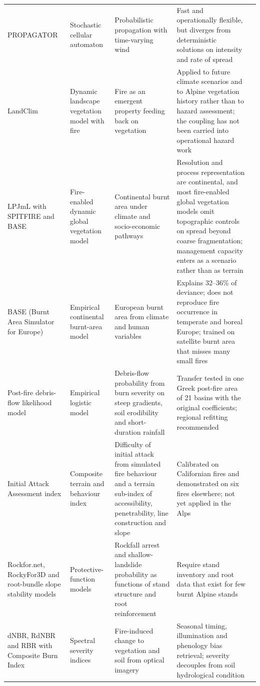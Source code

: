 \documentclass[11pt,a4paper]{article}
\begin{document}
{\begin{xltabular}{\textwidth}{@{}>{\raggedright\arraybackslash}p{2.35cm} >{\raggedright\arraybackslash}p{2.1cm} >{\raggedright\arraybackslash}X >{\raggedright\arraybackslash}X >{\raggedright\arraybackslash}p{2.5cm}@{}}
PROPAGATOR & Stochastic cellular automaton & Probabilistic propagation with time-varying wind & Fast and operationally flexible, but diverges from deterministic solutions on intensity and rate of spread & \citealp{malanchini_modeling_2025} \\
LandClim & Dynamic landscape vegetation model with fire & Fire as an emergent property feeding back on vegetation & Applied to future climate scenarios and to Alpine vegetation history rather than to hazard assessment; the coupling has not been carried into operational hazard work & \citealp{schumacher_relative_2006, colombaroli_species_2010} \\
LPJmL with SPITFIRE and BASE & Fire-enabled dynamic global vegetation model & Continental burnt area under climate and socio-economic pathways & Resolution and process representation are continental, and most fire-enabled global vegetation models omit topographic controls on spread beyond coarse fragmentation; management capacity enters as a scenario rather than as terrain & \citealp{jones_global_2022, billing_future_2026} \\
BASE (Burnt Area Simulator for Europe) & Empirical continental burnt-area model & European burnt area from climate and human variables & Explains 32--36\% of deviance; does not reproduce fire occurrence in temperate and boreal Europe; trained on satellite burnt area that misses many small fires & \citealp{forrest_understanding_2024} \\
Post-fire debris-flow likelihood model & Empirical logistic model & Debris-flow probability from burn severity on steep gradients, soil erodibility and short-duration rainfall & Transfer tested in one Greek post-fire area of 21 basins with the original coefficients; regional refitting recommended & \citealp{diakakis_exploring_2023} \\
Initial Attack Assessment index & Composite terrain and behaviour index & Difficulty of initial attack from simulated fire behaviour and a terrain sub-index of accessibility, penetrability, line construction and slope & Calibrated on Californian fires and demonstrated on six fires elsewhere; not yet applied in the Alps & \citealp{cardil_assessing_2025} \\
Rockfor.net, RockyFor3D and root-bundle slope stability models & Protective-function models & Rockfall arrest and shallow-landslide probability as functions of stand structure and root reinforcement & Require stand inventory and root data that exist for few burnt Alpine stands & \citealp{maringer_temporal_2016, moos_climate_2021, gehring_shallow_2019} \\
dNBR, RdNBR and RBR with Composite Burn Index & Spectral severity indices & Fire-induced change to vegetation and soil from optical imagery & Seasonal timing, illumination and phenology bias retrieval; severity decouples from soil hydrological condition & \citealp{morresi_mapping_2022, malandra_burn_2022, negri_wildfire_2026} \\
\end{xltabular}
}
\end{document}
